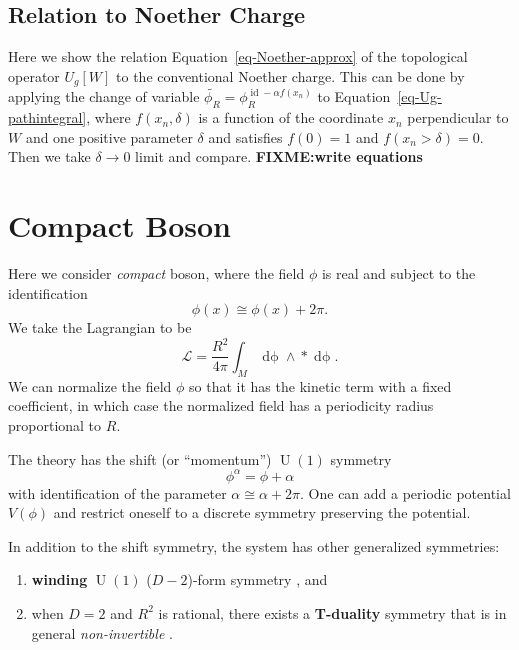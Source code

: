 \documentclass[
  letterpaper,
  DIV=11,
  numbers=noendperiod]{scrreport}
\providecommand{\tightlist}{%
  \setlength{\itemsep}{0pt}\setlength{\parskip}{0pt}}\usepackage{longtable,booktabs,array}
\DeclareMathOperator{\U}{U}
\DeclareMathOperator{\id}{id}
\newcommand{\stdim}{D}
\begin{document}
\section{Relation to Noether Charge}\label{relation-to-noether-charge}

Here we show the relation Equation~\ref{eq-Noether-approx} of the
topological operator \(U_g[W]\) to the conventional Noether charge. This
can be done by applying the change of variable
\(\widetilde{\phi_R} = \phi^{\id - \alpha f(x_n)}_R\) to
Equation~\ref{eq-Ug-pathintegral}, where \(f(x_n,\delta)\) is a function
of the coordinate \(x_n\) perpendicular to \(W\) and one positive
parameter \(\delta\) and satisfies \(f(0) = 1\) and
\(f(x_n>\delta) =0\). Then we take \(\delta\to 0\) limit and compare.
\textbf{FIXME:write equations}


\chapter{Compact Boson}\label{sec-compact-boson}

Here we consider \emph{compact} boson, where the field \(\phi\) is real
and subject to the identification \[
\phi(x) \cong \phi(x) + 2\pi.
\] We take the Lagrangian to be \[
\mathcal{L} = \frac{R^2}{4\pi}\int_M \mathop{d\phi} \wedge \mathop{*}\mathop{d\phi}.
\] We can normalize the field \(\phi\) so that it has the kinetic term
with a fixed coefficient, in which case the normalized field has a
periodicity radius proportional to \(R\).

The theory has the shift (or ``momentum'') \(\U(1)\) symmetry \[
\phi^\alpha = \phi + \alpha 
\] with identification of the parameter \(\alpha \cong \alpha + 2\pi\).
One can add a periodic potential \(V(\phi)\) and restrict oneself to a
discrete symmetry preserving the potential.

In addition to the shift symmetry, the system has other generalized
symmetries:

\begin{enumerate}
\def\labelenumi{\arabic{enumi}.}
\tightlist
\item
  \textbf{winding} \(\U(1)\) (\(\stdim-2\))-form symmetry
  \autocite{Gaiotto:2014kfa}, and
\item
  when \(\stdim=2\) and \(R^2\) is rational, there exists a
  \textbf{T-duality} symmetry that is in general \emph{non-invertible}
  \autocites{Choi:2021kmx}{Niro:2022ctq}{Cordova:2023ent,Nagoya:2023zky}.
\end{enumerate}
\end{document}
